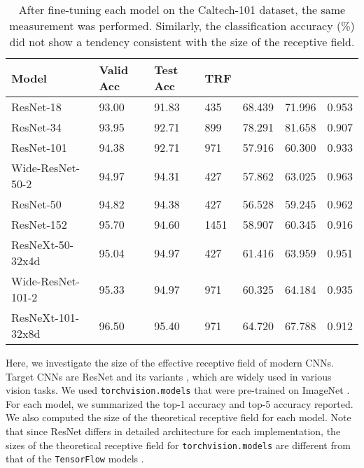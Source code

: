 \documentclass[letterpaper]{article} \usepackage{aaai22}  \usepackage{times}  \usepackage{helvet}  \usepackage{courier}  \usepackage[hyphens]{url}  \usepackage{graphicx} \urlstyle{rm} \def\UrlFont{\rm}  \usepackage{natbib}  \usepackage{caption} \DeclareCaptionStyle{ruled}{labelfont=normalfont,labelsep=colon,strut=off} \frenchspacing  \setlength{\pdfpagewidth}{8.5in}  \setlength{\pdfpageheight}{11in}  \usepackage{algorithm}
\begin{document}
\begin{table*}[t!]
	\centering
    \begin{tabular}{l|l|l|l|l|l|l}
\toprule
        \textbf{Model}    & \textbf{Valid Acc} & \textbf{Test Acc} & \textbf{TRF} &  &  &  \\
		\midrule
		ResNet-18         & 93.00             & 91.83            & 435          & 68.439         & 71.996         & 0.953 \\
		ResNet-34         & 93.95             & 92.71            & 899          & 78.291         & 81.658         & 0.907 \\
		ResNet-101        & 94.38             & 92.71            & 971          & 57.916         & 60.300         & 0.933 \\
		Wide-ResNet-50-2  & 94.97             & 94.31            & 427          & 57.862         & 63.025         & 0.963 \\
		ResNet-50         & 94.82             & 94.38            & 427          & 56.528         & 59.245         & 0.962 \\
		ResNet-152        & 95.70             & 94.60            & 1451         & 58.907         & 60.345         & 0.916 \\
		ResNeXt-50-32x4d  & 95.04             & 94.97            & 427          & 61.416         & 63.959         & 0.951 \\
		Wide-ResNet-101-2 & 95.33             & 94.97            & 971          & 60.325         & 64.184         & 0.935 \\
		ResNeXt-101-32x8d & 96.50             & 95.40            & 971          & 64.720         & 67.788         & 0.912 \\
		\bottomrule
	\end{tabular}
    \caption{After fine-tuning each model on the Caltech-101 dataset, the same measurement was performed. Similarly, the classification accuracy (\%) did not show a tendency consistent with the size of the receptive field.}
	\label{tab:rf_for_caltech}
\end{table*}

Here, we investigate the size of the effective receptive field of modern CNNs. Target CNNs are ResNet and its variants \cite{he2016deep,zagoruyko2016wide,xie2017aggregated}, which are widely used in various vision tasks. We used \texttt{torchvision.models} \cite{paszke2019pytorch,paszke2017automatic} that were pre-trained on ImageNet \cite{russakovsky2015imagenet}. For each model, we summarized the top-1 accuracy and top-5 accuracy reported. We also computed the size of the theoretical receptive field for each model. Note that since ResNet differs in detailed architecture for each implementation, the sizes of the theoretical receptive field for \texttt{torchvision.models} are different from that of the \texttt{TensorFlow} models \cite{araujo2019computing,silberman2016tensorflow}.
\end{document}
